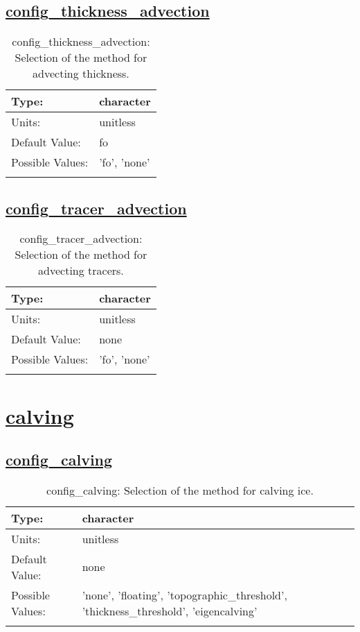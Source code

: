 \subsection[config\_thickness\_advection]{\hyperref[sec:nm_tab_advection]{config\_thickness\_advection}}
\label{subsec:nm_sec_config_thickness_advection}
\begin{center}
\begin{longtable}{| p{2.0in} || p{4.0in} |}
    \hline
    Type: & character \\
    \hline
    Units: & \si{unitless} \\
    \hline
    Default Value: & fo \\
    \hline
    Possible Values: & 'fo', 'none' \\
    \hline
    \caption{config\_thickness\_advection: Selection of the method for advecting thickness.}
\end{longtable}
\end{center}
\subsection[config\_tracer\_advection]{\hyperref[sec:nm_tab_advection]{config\_tracer\_advection}}
\label{subsec:nm_sec_config_tracer_advection}
\begin{center}
\begin{longtable}{| p{2.0in} || p{4.0in} |}
    \hline
    Type: & character \\
    \hline
    Units: & \si{unitless} \\
    \hline
    Default Value: & none \\
    \hline
    Possible Values: & 'fo', 'none' \\
    \hline
    \caption{config\_tracer\_advection: Selection of the method for advecting tracers.}
\end{longtable}
\end{center}
\section[calving]{\hyperref[sec:nm_tab_calving]{calving}}
\label{sec:nm_sec_calving}
\subsection[config\_calving]{\hyperref[sec:nm_tab_calving]{config\_calving}}
\label{subsec:nm_sec_config_calving}
\begin{center}
\begin{longtable}{| p{2.0in} || p{4.0in} |}
    \hline
    Type: & character \\
    \hline
    Units: & \si{unitless} \\
    \hline
    Default Value: & none \\
    \hline
    Possible Values: & 'none', 'floating', 'topographic\_threshold', 'thickness\_threshold', 'eigencalving'  \\
    \hline
    \caption{config\_calving: Selection of the method for calving ice.}
\end{longtable}
\end{center}
